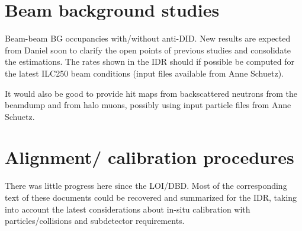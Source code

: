 \vspace{2cm}

\section{Beam background studies}

Beam-beam BG occupancies with/without anti-DID. New results are expected from Daniel soon to clarify the open points of previous studies and consolidate the estimations. The rates shown in the IDR should if possible be computed for the latest ILC250 beam conditions (input files available from Anne Schuetz).

It would also be good to provide hit maps from backscattered neutrons from the beamdump and from halo muons, possibly using input particle files from Anne Schuetz.

\vspace{2cm}

\section{Alignment/ calibration procedures}

There was little progress here since the LOI/DBD. Most of the corresponding text of these documents could be recovered and summarized for the IDR, taking into account the latest considerations about in-situ calibration with particles/collisions and subdetector requirements.

\vspace{2cm}


